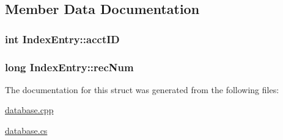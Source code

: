 \subsection{Member Data Documentation}
\hypertarget{struct_index_entry_aa5008695f70f365c7959d42ccca0fa13}{
\subsubsection[{acct\-I\-D}]{\setlength{\rightskip}{0pt plus 5cm}int Index\-Entry\-::acct\-I\-D}}\label{struct_index_entry_aa5008695f70f365c7959d42ccca0fa13}
\hypertarget{struct_index_entry_a3f71077b699f2d718ca60df893c4c470}{
\subsubsection[{rec\-Num}]{\setlength{\rightskip}{0pt plus 5cm}long Index\-Entry\-::rec\-Num}}\label{struct_index_entry_a3f71077b699f2d718ca60df893c4c470}


The documentation for this struct was generated from the following files\-:\begin{DoxyCompactItemize}
\item 
\hyperlink{database_8cpp}{database.\-cpp}\item 
\hyperlink{database_8cs}{database.\-cs}\end{DoxyCompactItemize}
